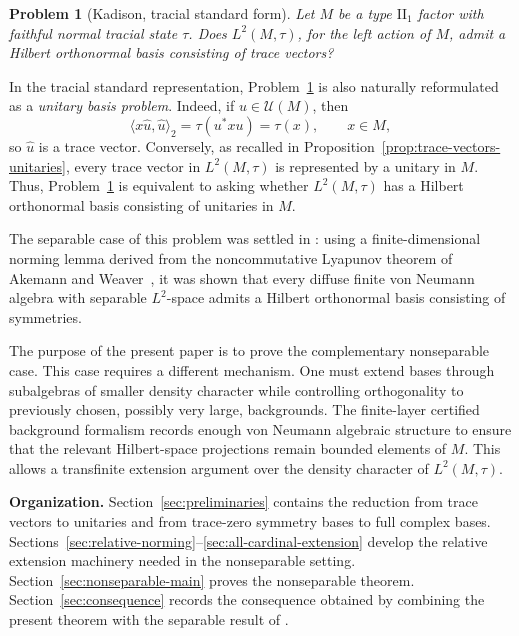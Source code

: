 \documentclass[11pt,letterpaper,reqno]{amsart}
\newtheorem{prob}[thm]{Problem}
\theoremstyle{definition}
\numberwithin{equation}{section}
\begin{document}
\begin{prob}[Kadison, tracial standard form]\label{prob:kadison}
Let \(M\) be a type \(\mathrm{II}_1\) factor with faithful normal tracial
state \(\tau\). Does \(L^2(M,\tau)\), for the left action of \(M\), admit a
Hilbert orthonormal basis consisting of trace vectors?
\end{prob}

In the tracial standard representation, Problem~\ref{prob:kadison} is also naturally reformulated as a
\emph{unitary basis problem}.  Indeed, if \(u\in\mathcal U(M)\), then
\[
   \langle x\widehat u,\widehat u\rangle_2
   =
   \tau(u^*xu)
   =
   \tau(x),\qquad x\in M,
\]
so \(\widehat u\) is a trace vector.  Conversely, as recalled in
Proposition~\ref{prop:trace-vectors-unitaries}, every trace vector in
\(L^2(M,\tau)\) is represented by a unitary in \(M\).  Thus,
Problem~\ref{prob:kadison} is equivalent to asking whether
\(L^2(M,\tau)\) has a Hilbert orthonormal basis consisting of unitaries in \(M\).

    
The separable case of this problem was settled in \cite{HTZ26}: using a
finite-dimensional norming lemma derived from the noncommutative Lyapunov
theorem of Akemann and Weaver~\cite{AW03}, it was shown that every diffuse finite von
Neumann algebra with separable $L^2$-space admits a Hilbert orthonormal basis
consisting of symmetries.

The purpose of the present paper is to prove the complementary nonseparable
case.  This case requires a different mechanism.  One must extend bases
through subalgebras of smaller density character while controlling
orthogonality to previously chosen, possibly very large, backgrounds.  The
finite-layer certified background formalism records enough von Neumann
algebraic structure to ensure that the relevant Hilbert-space projections
remain bounded elements of $M$.  This allows a transfinite extension argument
over the density character of $L^2(M,\tau)$.



\medskip
\noindent\textbf{Organization.}
Section~\ref{sec:preliminaries} contains the reduction from trace vectors to
unitaries and from trace-zero symmetry bases to full complex bases.
Sections~\ref{sec:relative-norming}--\ref{sec:all-cardinal-extension}
develop the relative extension machinery needed in the nonseparable setting.
Section~\ref{sec:nonseparable-main} proves the nonseparable theorem.
Section~\ref{sec:consequence} records the consequence obtained by combining
the present theorem with the separable result of \cite{HTZ26}.
\end{document}
